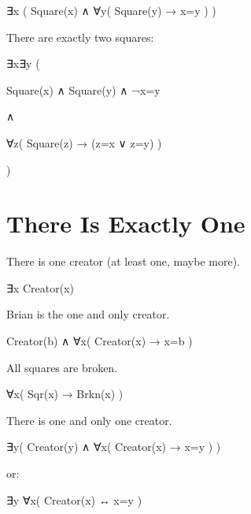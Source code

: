 \documentclass[12pt]{extarticle}
\begin{document}
\begin{multicols*}{3}
\hspace{5mm} ∃x ( Square(x) ∧ ∀y( Square(y) → x=y ) )
 
There are exactly two squares:
 
\hspace{5mm} ∃x∃y (
 
\hspace{10mm} Square(x) ∧ Square(y) ∧ ¬x=y
 
\hspace{10mm} ∧
 
\hspace{10mm} ∀z( Square(z) → (z=x ∨ z=y) )
 
\hspace{5mm} )
 
 
 
\section{There Is Exactly One}
 
There is one creator (at least one, maybe more).
 
\hspace{3mm} ∃x Creator(x)
 
Brian is the one and only creator.
 
\hspace{3mm} Creator(b) ∧ ∀x( Creator(x) → x=b )
 
All squares are broken.
 
\hspace{3mm} ∀x( Sqr(x) → Brkn(x) )
 
There is one and only one creator.
 
\hspace{3mm} ∃y( Creator(y) ∧ ∀x( Creator(x) → x=y ) )
 
\hspace{3mm} or:
 
\hspace{3mm} ∃y ∀x( Creator(x) ↔ x=y )
 

 
 


\end{multicols*}
\end{document}
